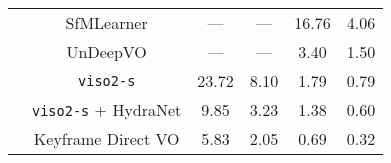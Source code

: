 \begin{table*}[]
{\begin{threeparttable}
\begin{tabular}{cccccc}
		& SfMLearner & --- & --- & 16.76 & 4.06 \\
		& UnDeepVO & --- & --- & 3.40 & 1.50 \\
		& \texttt{viso2-s} & 23.72 & 8.10 & 1.79 & 0.79 \\
		& \texttt{viso2-s} + HydraNet & 9.85 & 3.23 & 1.38 & 0.60 \\
		& Keyframe Direct VO & 5.83 & 2.05 & 0.69 & 0.32 \\ \bottomrule
	\end{tabular}
\label{tab:kitti_fusion_stats}
\end{threeparttable}
}
\end{table*}


